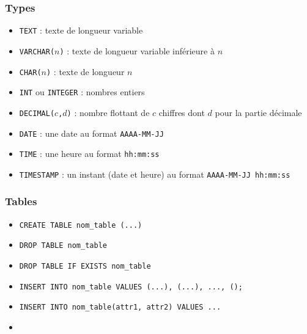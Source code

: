 \documentclass[a4paper,17pt]{extarticle}
\providecommand{\tightlist}{%
      \setlength{\itemsep}{0pt}\setlength{\parskip}{0pt}}
\begin{document}
    \hypertarget{types}{%
\subsubsection{Types}\label{types}}

\begin{itemize}
\tightlist
\item
  \texttt{TEXT} : texte de longueur variable
\item
  \texttt{VARCHAR(}\(n\)\texttt{)} : texte de longueur variable
  inférieure à \(n\)
\item
  \texttt{CHAR(}\(n\)\texttt{)} : texte de longueur \(n\)
\item
  \texttt{INT} ou \texttt{INTEGER} : nombres entiers
\item
  \texttt{DECIMAL(}\(c\)\texttt{,}\(d\)\texttt{)} : nombre flottant de
  \(c\) chiffres dont \(d\) pour la partie décimale
\item
  \texttt{DATE} : une date au format \texttt{AAAA-MM-JJ}
\item
  \texttt{TIME} : une heure au format \texttt{hh:mm:ss}
\item
  \texttt{TIMESTAMP} : un instant (date et heure) au format
  \texttt{AAAA-MM-JJ\ hh:mm:ss}
\end{itemize}

    \hypertarget{tables}{%
\subsubsection{Tables}\label{tables}}

\begin{itemize}
\tightlist
\item
  \texttt{CREATE\ TABLE\ nom\_table\ (...)}
\item
  \texttt{DROP\ TABLE\ nom\_table}
\item
  \texttt{DROP\ TABLE\ IF\ EXISTS\ nom\_table}
\item
  \texttt{INSERT\ INTO\ nom\_table\ VALUES\ (...),\ (...),\ ...,\ ();}
\item
  \texttt{INSERT\ INTO\ nom\_table(attr1,\ attr2)\ VALUES\ ...}
\item
\end{itemize}


    
    
    
\end{document}
